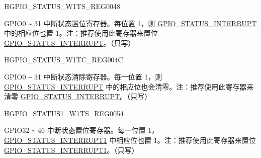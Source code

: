 \begin{register}{H}{GPIO\_STATUS\_W1TS\_REG}{\hexprefix{}0048}\label{regdesc:GPIOSTATUSW1TSREG}
%
\regnewline%
\begin{regdesc}\begin{reglist}
\label{fielddesc:GPIOSTATUSW1TS}\item [GPIO\_STATUS\_W1TS] GPIO0 \verb+~+ 31 中断状态置位寄存器。每位置 1，则  \hyperref[fielddesc:GPIOSTATUSINTERRUPT]{GPIO\_STATUS\_INTERRUPT} 中的相应位也置 1。注：推荐使用此寄存器来置位 \hyperref[fielddesc:GPIOSTATUSINTERRUPT]{GPIO\_STATUS\_INTERRUPT}。（只写）
\end{reglist}\end{regdesc}
\end{register}


\begin{register}{H}{GPIO\_STATUS\_W1TC\_REG}{\hexprefix{}004C}\label{regdesc:GPIOSTATUSW1TCREG}
%
\regnewline%
\begin{regdesc}\begin{reglist}
\label{fielddesc:GPIOSTATUSW1TC}\item [GPIO\_STATUS\_W1TC] GPIO0 \verb+~+ 31 中断状态清除寄存器。每一位置 1，则  \hyperref[fielddesc:GPIOSTATUSINTERRUPT]{GPIO\_STATUS\_INTERRUPT} 中的相应位也会清零。注：推荐使用此寄存器来清零 \hyperref[fielddesc:GPIOSTATUSINTERRUPT]{GPIO\_STATUS\_INTERRUPT}。（只写）
\end{reglist}\end{regdesc}
\end{register}


\begin{register}{H}{GPIO\_STATUS1\_W1TS\_REG}{\hexprefix{}0054}\label{regdesc:GPIOSTATUS1W1TSREG}
%
%
\regnewline%
\begin{regdesc}\begin{reglist}
\label{fielddesc:GPIOSTATUS1W1TS}\item [GPIO\_STATUS1\_W1TS] GPIO32 \verb+~+ 46 中断状态置位寄存器。每一位置 1， \hyperref[fielddesc:GPIOSTATUS1INTERRUPT]{GPIO\_STATUS\_INTERRUPT1} 中相应位也置 1。注：推荐使用此寄存器来置位 \hyperref[fielddesc:GPIOSTATUS1INTERRUPT]{GPIO\_STATUS\_INTERRUPT1}。（只写）
\end{reglist}\end{regdesc}
\end{register}


